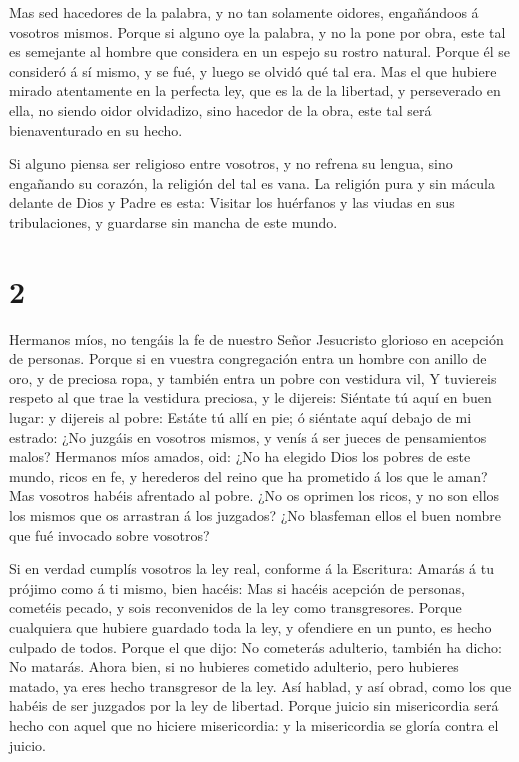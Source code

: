  Mas sed hacedores de la palabra, y no tan solamente
oidores, engañándoos á vosotros mismos.  Porque si alguno
oye la palabra, y no la pone por obra, este tal es semejante al hombre
que considera en un espejo su rostro natural.  Porque él se
consideró á sí mismo, y se fué, y luego se olvidó qué tal era.
 Mas el que hubiere mirado atentamente en la perfecta ley,
que es la de la libertad, y perseverado en ella, no siendo oidor
olvidadizo, sino hacedor de la obra, este tal será bienaventurado en su
hecho.

 Si alguno piensa ser religioso entre vosotros, y no
refrena su lengua, sino engañando su corazón, la religión del tal es
vana.  La religión pura y sin mácula delante de Dios y
Padre es esta: Visitar los huérfanos y las viudas en sus tribulaciones,
y guardarse sin mancha de este mundo.

\hypertarget{section-1}{%
\section{2}\label{section-1}}

 Hermanos míos, no tengáis la fe de nuestro Señor Jesucristo
glorioso en acepción de personas.  Porque si en vuestra
congregación entra un hombre con anillo de oro, y de preciosa ropa, y
también entra un pobre con vestidura vil,  Y tuviereis
respeto al que trae la vestidura preciosa, y le dijereis: Siéntate tú
aquí en buen lugar: y dijereis al pobre: Estáte tú allí en pie; ó
siéntate aquí debajo de mi estrado:  ¿No juzgáis en vosotros
mismos, y venís á ser jueces de pensamientos malos? 
Hermanos míos amados, oid: ¿No ha elegido Dios los pobres de este mundo,
ricos en fe, y herederos del reino que ha prometido á los que le aman?
 Mas vosotros habéis afrentado al pobre. ¿No os oprimen los
ricos, y no son ellos los mismos que os arrastran á los juzgados?
 ¿No blasfeman ellos el buen nombre que fué invocado sobre
vosotros?

 Si en verdad cumplís vosotros la ley real, conforme á la
Escritura: Amarás á tu prójimo como á ti mismo, bien hacéis:
 Mas si hacéis acepción de personas, cometéis pecado, y sois
reconvenidos de la ley como transgresores.  Porque
cualquiera que hubiere guardado toda la ley, y ofendiere en un punto, es
hecho culpado de todos.  Porque el que dijo: No cometerás
adulterio, también ha dicho: No matarás. Ahora bien, si no hubieres
cometido adulterio, pero hubieres matado, ya eres hecho transgresor de
la ley.  Así hablad, y así obrad, como los que habéis de
ser juzgados por la ley de libertad.  Porque juicio sin
misericordia será hecho con aquel que no hiciere misericordia: y la
misericordia se gloría contra el juicio.

